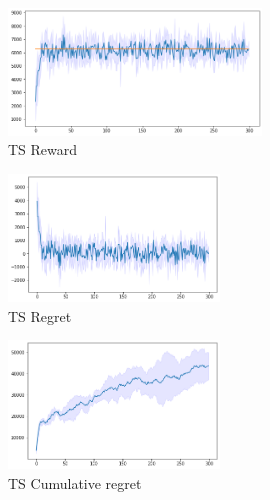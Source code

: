 \begin{figure}[ht]
    \begin{center}
    \includegraphics[width=0.6\textwidth]{img/ts_reward5.png}
    \caption{TS Reward}
    \label{fig:reward52}
    \end{center}
\end{figure}
\begin{multicols}{2}
    \begin{figure}[H]
        \begin{center}
        \includegraphics[width=0.5\textwidth]{img/ts_regret5.png}
        \caption{TS Regret}
        \label{fig:regret52}
        \end{center}
    \end{figure}
    \columnbreak
    \begin{figure}[H]
        \begin{center}
        \includegraphics[width=0.5\textwidth]{img/ts_cum_regret5.png}
        \caption{TS Cumulative regret}
        \label{fig:cum_reg52}
        \end{center}
    \end{figure}
\end{multicols}
